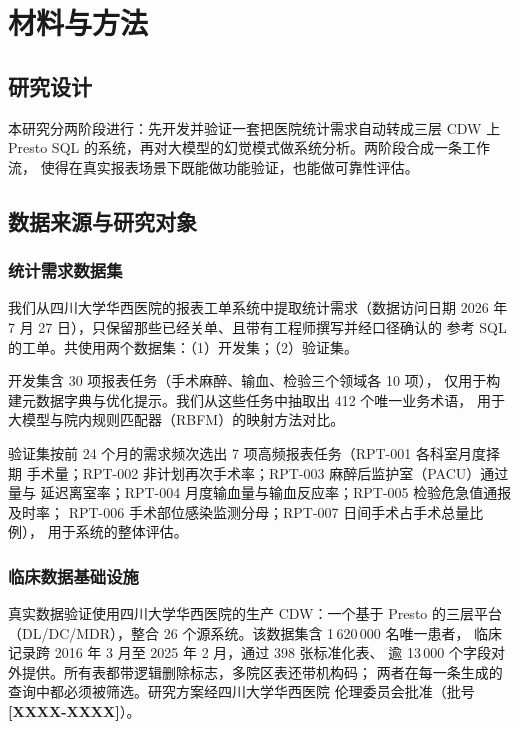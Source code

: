 \documentclass[11pt,a4paper]{article}
\newcommand{\PH}[1]{{\color{red}\textbf{[#1]}}}
\begin{document}
\section{材料与方法}

\subsection{研究设计}
本研究分两阶段进行：先开发并验证一套把医院统计需求自动转成三层 CDW 上
Presto SQL 的系统，再对大模型的幻觉模式做系统分析。两阶段合成一条工作流，
使得在真实报表场景下既能做功能验证，也能做可靠性评估。

\subsection{数据来源与研究对象}

\subsubsection{统计需求数据集}
我们从四川大学华西医院的报表工单系统中提取统计需求（数据访问日期
2026 年 7 月 27 日），只保留那些已经关单、且带有工程师撰写并经口径确认的
参考 SQL 的工单。共使用两个数据集：（1）开发集；（2）验证集。

开发集含 30 项报表任务（手术麻醉、输血、检验三个领域各 10 项），
仅用于构建元数据字典与优化提示。我们从这些任务中抽取出 412 个唯一业务术语，
用于大模型与院内规则匹配器（RBFM）的映射方法对比。

验证集按前 24 个月的需求频次选出 7 项高频报表任务（RPT-001 各科室月度择期
手术量；RPT-002 非计划再次手术率；RPT-003 麻醉后监护室（PACU）通过量与
延迟离室率；RPT-004 月度输血量与输血反应率；RPT-005 检验危急值通报及时率；
RPT-006 手术部位感染监测分母；RPT-007 日间手术占手术总量比例），
用于系统的整体评估。

\subsubsection{临床数据基础设施}
真实数据验证使用四川大学华西医院的生产 CDW：一个基于 Presto 的三层平台
（DL/DC/MDR），整合 26 个源系统。该数据集含 1\,620\,000 名唯一患者，
临床记录跨 2016 年 3 月至 2025 年 2 月，通过 398 张标准化表、
逾 13\,000 个字段对外提供。所有表都带逻辑删除标志，多院区表还带机构码；
两者在每一条生成的查询中都必须被筛选。研究方案经四川大学华西医院
伦理委员会批准（批号 \PH{XXXX-XXXX}）。
\end{document}
